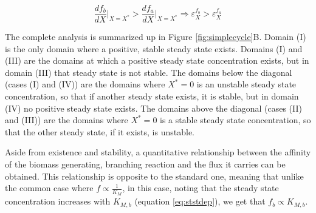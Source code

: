     \begin{equation*}
        \frac{df_b}{dX}\Big\vert_{X=X^*}>\frac{df_a}{dX}\Big\vert_{X=X^*} \Rightarrow \varepsilon^{f_b}_X>\varepsilon^{f_a}_X
    \end{equation*}
    
    The complete analysis is summarized up in Figure \ref{fig:simplecycle}B.
    Domain (I) is the only domain where a positive, stable steady state exists.
    Domains (I) and (III) are the domains at which a positive steady state concentration exists, but in domain (III) that steady state is not stable.
    The domains below the diagonal (cases (I) and (IV)) are the domains where $X^*=0$ is an unstable steady state concentration, so that if another steady state exists, it is stable, but in domain (IV) no positive steady state exists.
    The domains above the diagonal (cases (II) and (III)) are the domains where $X^*=0$ is a stable steady state concentration, so that the other steady state, if it exists, is unstable.

    Aside from existence and stability, a quantitative relationship between the affinity of the biomass generating, branching reaction and the flux it carries can be obtained.
    This relationship is opposite to the standard one, meaning that unlike the common case where $f\propto\frac{1}{K_M}$, in this case, noting that the steady state concentration increases with $K_{M,b}$ (equation \ref{eq:ststdep}), we get that $f_b \propto K_{M,b}$.

